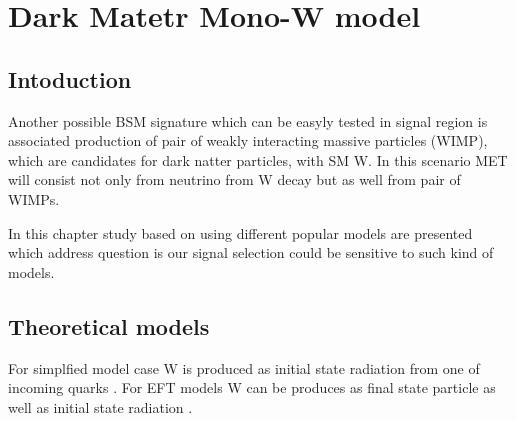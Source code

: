 \chapter{Dark Matetr Mono-W model}
\label{chap:monoW}


\section{Intoduction}

Another possible BSM signature which can be easyly tested in signal region is
associated production of pair of weakly interacting massive particles (WIMP), 
which are candidates for dark natter particles, with SM W. 
In this scenario MET will consist not only from neutrino from W decay but as 
well from pair of WIMPs.

In this chapter study based on using different popular models are presented 
which address question is our signal selection could be sensitive to such 
kind of models.



\section{Theoretical models}







For simplfied model case W is produced as initial state radiation from one of incoming quarks . 
For EFT models W can be produces as final state particle  as well as initial state radiation .

